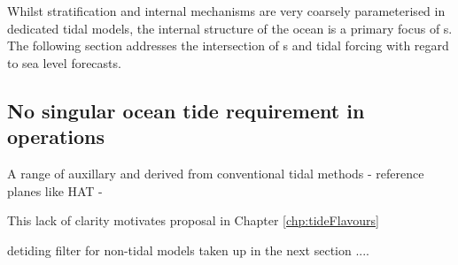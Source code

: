 Whilst stratification and internal mechanisms are very coarsely parameterised in dedicated tidal models, the internal structure of the ocean is a primary focus of \OGCM{}s.   The following section addresses the intersection of \OGCM{}s and tidal forcing with regard to sea level forecasts.


\subsection{No singular ocean tide requirement in operations}

A range of auxillary and derived from conventional tidal methods
- reference planes like HAT
- 



This lack of clarity motivates proposal in Chapter \ref{chp:tideFlavours}



detiding filter for non-tidal models taken up in the next section ....